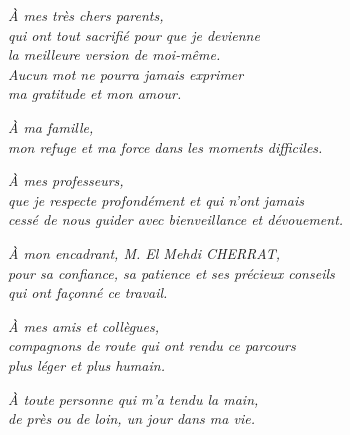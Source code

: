 
\newpage
\thispagestyle{empty}


\begin{flushright}

{\large\textit{À mes très chers parents,}}\\[0.3cm]
{\normalsize\textit{qui ont tout sacrifié pour que je devienne}}\\
{\normalsize\textit{la meilleure version de moi-même.}}\\
{\normalsize\textit{Aucun mot ne pourra jamais exprimer}}\\
{\normalsize\textit{ma gratitude et mon amour.}}

\vspace{0.25cm}

{\large\textit{À ma famille,}}\\[0.2cm]
{\normalsize\textit{mon refuge et ma force dans les moments difficiles.}}

\vspace{0.45cm}

{\large\textit{À mes professeurs,}}\\[0.2cm]
{\normalsize\textit{que je respecte profondément et qui n'ont jamais}}\\
{\normalsize\textit{cessé de nous guider avec bienveillance et dévouement.}}

\vspace{0.45cm}

{\large\textit{À mon encadrant, M. El Mehdi CHERRAT,}}\\[0.2cm]
{\normalsize\textit{pour sa confiance, sa patience et ses précieux conseils}}\\
{\normalsize\textit{qui ont façonné ce travail.}}

\vspace{0.45cm}

{\large\textit{À mes amis et collègues,}}\\[0.2cm]
{\normalsize\textit{compagnons de route qui ont rendu ce parcours}}\\
{\normalsize\textit{plus léger et plus humain.}}

\vspace{0.45cm}

{\large\textit{À toute personne qui m'a tendu la main,}}\\[0.2cm]
{\normalsize\textit{de près ou de loin, un jour dans ma vie.}}


\end{flushright}
